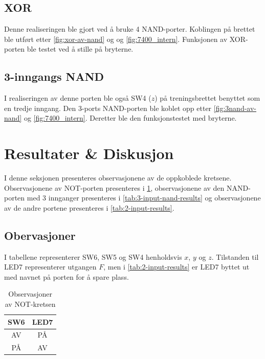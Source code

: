 \documentclass[11pt,a4paper,twocolumn]{article}
\begin{document}
\subsection{XOR}
Denne realiseringen ble gjort ved å bruke 4 NAND-porter. Koblingen på brettet ble utført etter \cref{fig:xor-av-nand} og og \cref{fig:7400_intern}. Funksjonen av XOR-porten ble testet ved å stille på bryterne.

\subsection{3-inngangs NAND}
I realiseringen av denne porten ble også SW4 ($z$) på treningsbrettet benyttet som en tredje inngang. Den 3-ports NAND-porten ble koblet opp etter \cref{fig:3nand-av-nand} og \cref{fig:7400_intern}. Deretter ble den funksjonstestet med bryterne.

\section{Resultater \& Diskusjon}
I denne seksjonen presenteres observasjonene av de oppkoblede kretsene. Observasjonene av NOT-porten presenteres i \cref{tab:not-results}, observasjonene av den NAND-porten med 3 innganger presenteres i \cref{tab:3-input-nand-results} og observasjonene av de andre portene presenteres i \cref{tab:2-input-results}.

\subsection{Obervasjoner}

I tabellene representerer SW6, SW5 og SW4 henholdsvis $x$, $y$ og $z$. Tilstanden til LED7 representerer utgangen $F$, men i \cref{tab:2-input-results} er LED7 byttet ut med navnet på porten for å spare plass.

\begin{table}[h]
	\centering %
	\setlength{\belowcaptionskip}{6pt} %
	\setlength{\tabcolsep}{3pt} %

	\caption{Observasjoner av NOT-kretsen}
	\label{tab:not-results}

	\noindent
	\begin{tabular}{c|c} %
		\hline
		SW6 & LED7 \\
		\hline
		AV & PÅ \\
		PÅ & AV \\
		\hline
	\end{tabular}
\end{table}
\end{document}
